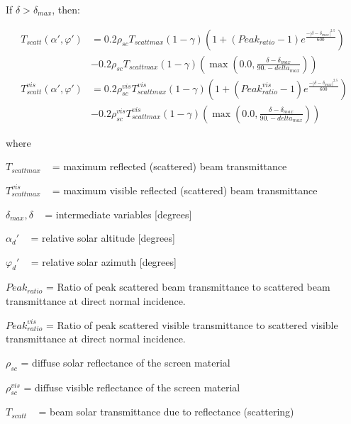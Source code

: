 If $\delta > \delta_{max}$, then:

\begin{equation}
  \begin{array}{rl}
    T_{scatt} \left( \alpha ',\varphi ' \right) &= 0.2 \rho_{sc} T_{scattmax} \left( 1 - \gamma \right) \left( 1 + \left( Peak_{ratio} - 1 \right) e^{\frac{- \left| \delta - \delta_{max} \right|^{2.5}}{600}} \right) \\
                                                &- 0.2 \rho_{sc} T_{scattmax} \left( 1 - \gamma \right) \left( \max \left( 0.0, \frac{\delta  - \delta_{max}}{90. - {delta_{max}}} \right) \right) \\
    T_{scatt}^{vis} \left( \alpha ',\varphi ' \right) &= 0.2 \rho_{sc}^{vis} T_{scattmax}^{vis} \left( 1 - \gamma \right) \left( 1 + \left( Peak_{ratio}^{vis} - 1 \right) e^{\frac{- \left| \delta - \delta_{max} \right|^{2.5}}{600}} \right) \\
                                                      &- 0.2 \rho_{sc}^{vis} T_{scattmax}^{vis} \left( 1 - \gamma \right) \left( \max \left( 0.0, \frac{\delta  - \delta_{max}}{90. - {delta_{max}}} \right) \right)
  \end{array}
\end{equation}

where

\({T_{scattmax}}\) ~ = maximum reflected (scattered) beam transmittance

\(T_{scattmax}^{vis}\) ~ = maximum visible reflected (scattered) beam transmittance

\({\delta_{max}},\delta\) ~ = intermediate variables {[}degrees{]}

\(\alpha_d'\) ~ = relative solar altitude {[}degrees{]}

\(\varphi_d'\) ~ = relative solar azimuth {[}degrees{]}

\(Pea{k_{ratio}}\) = Ratio of peak scattered beam transmittance to scattered beam transmittance at direct normal incidence.

\(Peak_{ratio}^{vis}\) = Ratio of peak scattered visible transmittance to scattered visible transmittance at direct normal incidence.

\({\rho_{sc}}\) = diffuse solar reflectance of the screen material

\(\rho_{sc}^{vis}\) = diffuse visible reflectance of the screen material

\({T_{scatt}}\) ~ = beam solar transmittance due to reflectance (scattering)

